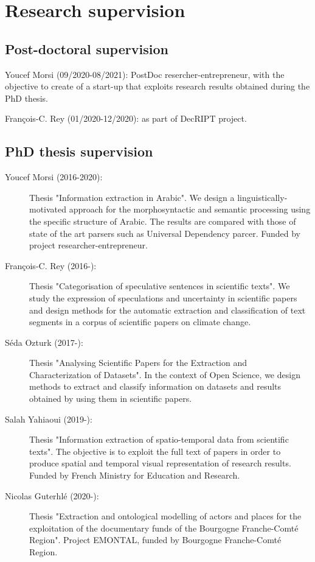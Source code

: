 \documentclass[11pt,a4paper,roman]{moderncv}
\begin{document}
\section{Research supervision}

\subsection{Post-doctoral supervision}

\begin{description}
	\item Youcef Morsi (09/2020-08/2021): PostDoc resercher-entrepreneur, with the objective to create of a start-up that exploits research results obtained during the PhD thesis.
	\item François-C. Rey (01/2020-12/2020): as part of DecRIPT project.
\end{description}


\subsection{PhD thesis supervision}

\begin{description}
	\item[Youcef Morsi (2016-2020):] Thesis "Information extraction in Arabic". We design a linguistically-motivated approach for the morphosyntactic and semantic processing using the specific structure of Arabic. The results are compared with those of state of the art parsers such as Universal Dependency parcer. Funded by project researcher-entrepreneur.
	\item[François-C. Rey (2016-):]  Thesis "Categorisation of speculative sentences in scientific texts". We study the expression of speculations and uncertainty in scientific papers and design methods for the automatic extraction and classification of text segments in a corpus of scientific papers on climate change.
	\item[Séda Ozturk (2017-):] Thesis "Analysing Scientific Papers for the Extraction and Characterization of Datasets". In the context of Open Science, we design methods to extract and classify information on datasets and results obtained by using them in scientific papers.
	\item[Salah Yahiaoui (2019-):] Thesis "Information extraction of spatio-temporal data from scientific texts". The objective is to exploit the full text of papers in order to produce spatial and temporal visual representation of research results. Funded by French Ministry for Education and Research.
	\item[Nicolas Guterhlé (2020-):] Thesis "Extraction and ontological modelling of actors and places for the exploitation of the documentary funds of the Bourgogne Franche-Comté Region". Project EMONTAL, funded by Bourgogne Franche-Comté Region.
\end{description}
\end{document}
